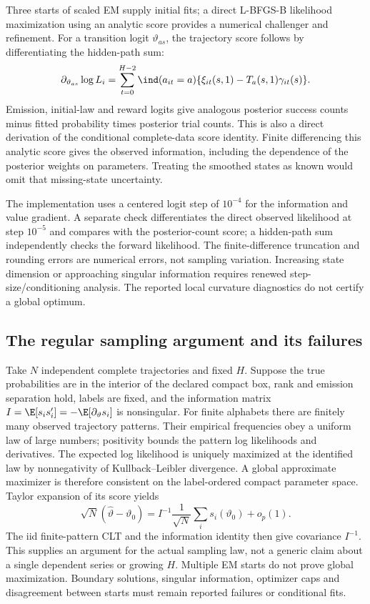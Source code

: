 Three starts of scaled EM supply initial fits; a direct L-BFGS-B
likelihood maximization using an analytic score provides a numerical
challenger and refinement. For a transition logit $\vartheta_{as}$, the
trajectory score follows by differentiating the hidden-path sum:
\[
 \partial_{\vartheta_{as}}\log L_i
 =\sum_{t=0}^{H-2}\ind(a_{it}=a)
       \{\xi_{it}(s,1)-T_a(s,1)\gamma_{it}(s)\}.
\]
Emission, initial-law and reward logits give analogous posterior success
counts minus fitted probability times posterior trial counts. This is
also a direct derivation of the conditional complete-data score identity.
Finite differencing this analytic score gives the observed information,
including the dependence of the posterior weights on parameters. Treating
the smoothed states as known would omit that missing-state uncertainty.

The implementation uses a centered logit step of $10^{-4}$ for the
information and value gradient. A separate check differentiates the direct
observed likelihood at step $10^{-5}$ and compares with the posterior-count
score; a hidden-path sum independently checks the forward likelihood.
The finite-difference truncation and rounding errors are numerical errors,
not sampling variation. Increasing state dimension or approaching singular
information requires renewed step-size/conditioning analysis. The reported
local curvature diagnostics do not certify a global optimum.

\subsection{The regular sampling argument and its failures}
Take $N$ independent complete trajectories and fixed $H$. Suppose the true
probabilities are in the interior of the declared compact box, rank and
emission separation hold, labels are fixed, and the information matrix
$I=\E[s_i s_i']=-\E[\partial_\vartheta s_i]$ is nonsingular.
For finite alphabets there are finitely many observed trajectory patterns.
Their empirical frequencies obey a uniform law of large numbers; positivity
bounds the pattern log likelihoods and derivatives. The expected log
likelihood is uniquely maximized at the identified law by nonnegativity
of Kullback--Leibler divergence. A global approximate maximizer is
therefore consistent on the label-ordered compact parameter space.
Taylor expansion of its score yields
\begin{equation}
 \sqrt N(\widehat\vartheta-\vartheta_0)
 =I^{-1}\frac1{\sqrt N}\sum_i s_i(\vartheta_0)+o_p(1).
 \label{s4:latent-mle-clt}
\end{equation}
The iid finite-pattern CLT and the information identity then give
covariance $I^{-1}$. This supplies an argument for the actual sampling
law, not a generic claim about a single dependent series or growing $H$.
Multiple EM starts do not prove global maximization. Boundary solutions,
singular information, optimizer caps and disagreement between starts must
remain reported failures or conditional fits.

